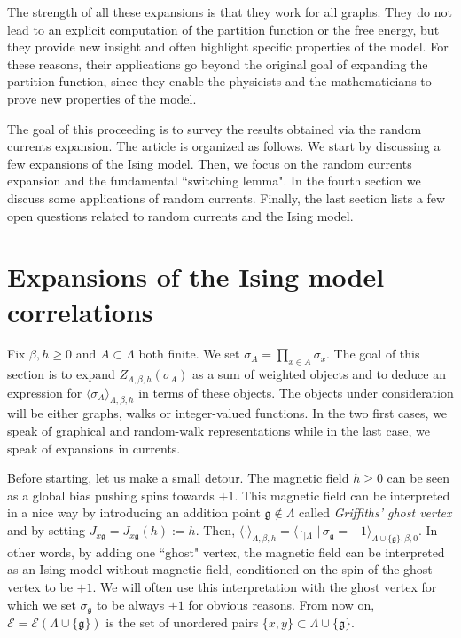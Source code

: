 \documentclass[a4paper,oneside,11pt]{article}
\newtheorem{remark}[theorem]{Remark}
\newcommand{\ee}{\end{equation}}
\newcommand{\be}{\begin{equation}}
\begin{document}
The strength of all these expansions is that they work for all graphs. They do not lead to an explicit computation of the partition function or the free energy, but they provide new insight and often highlight specific properties of the model. For these reasons, their applications go beyond the original goal of expanding the partition function, since they enable the physicists and the mathematicians to prove new properties of the model. 

 The goal of this proceeding is to survey the results obtained via the random currents expansion. 
The article is organized as follows. We start by discussing a few expansions of the Ising model. Then, we focus on the random currents expansion and the fundamental ``switching lemma". In the fourth section we discuss some applications of random currents. Finally, the last section lists a few open questions related to random currents and the Ising model.

\section{Expansions of the Ising model correlations}

Fix $\beta,h\ge0$ and $A\subset \Lambda$ both finite. We set $\sigma_A=\prod_{x\in A}\sigma_x$. The goal of this section is to expand $Z_{\Lambda,\beta,h}(\sigma_A)$ as a sum of weighted objects and to deduce an expression for $\langle\sigma_A\rangle_{\Lambda,\beta,h}$ in terms of these objects. The objects under consideration will be either graphs, walks or integer-valued functions. In the two first cases, we speak of graphical and random-walk representations 
while in the last case, we speak of expansions in currents.

Before starting, let us make a small detour. The magnetic field $h\ge0$ can be seen as a global bias pushing spins towards $+1$. This magnetic field can be interpreted in a nice way  by introducing an addition point $\mathfrak g\notin \Lambda$ called {\em Griffiths' ghost vertex} and by setting $J_{x\mathfrak g}=J_{x\mathfrak g}(h):=h$. Then, 
$\langle \cdot\rangle_{\Lambda,\beta,h}=\langle\cdot_{|\Lambda} \,|\,\sigma_{\mathfrak g}=+1\rangle_{\Lambda\cup\{\mathfrak g\},\beta,0}$.
In other words, by adding one ``ghost" vertex, the magnetic field can be interpreted as an Ising model without magnetic field, conditioned on the spin of the ghost vertex to be $+1$. We will often use this interpretation with the ghost vertex for which we set $\sigma_{\mathfrak g}$ to be always $+1$ for obvious reasons.
From now on, $\mathcal E=\mathcal E(\Lambda\cup\{\mathfrak g\})$ is the set of unordered pairs $\{x,y\}\subset \Lambda\cup\{\mathfrak g\}$. 
\end{document}
